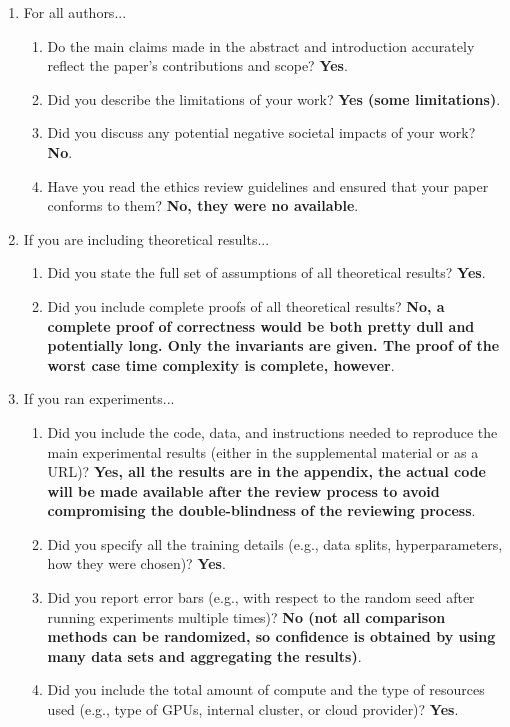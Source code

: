 \documentclass{article}
\begin{document}
\begin{enumerate}

\item For all authors...
\begin{enumerate}
  \item Do the main claims made in the abstract and introduction accurately reflect the paper's contributions and scope?
    \textbf{Yes}. %
  \item Did you describe the limitations of your work?
    \textbf{Yes (some limitations)}.
  \item Did you discuss any potential negative societal impacts of your work?
		\textbf{No}.
  \item Have you read the ethics review guidelines and ensured that your paper conforms to them?
		\textbf{No, they were no available}.
\end{enumerate}

\item If you are including theoretical results...
\begin{enumerate}
  \item Did you state the full set of assumptions of all theoretical results?
	\textbf{Yes}.
	\item Did you include complete proofs of all theoretical results?
	\textbf{No, a complete proof of correctness would be both pretty dull and potentially long. Only the invariants are given. The proof of the worst case time complexity is complete, however}.
\end{enumerate}

\item If you ran experiments...
\begin{enumerate}
  \item Did you include the code, data, and instructions needed to reproduce the main experimental results (either in the supplemental material or as a URL)?
		\textbf{Yes, all the results are in the appendix, the actual code will be made available after the review process to avoid compromising the double-blindness of the reviewing process}.
  \item Did you specify all the training details (e.g., data splits, hyperparameters, how they were chosen)?
		\textbf{Yes}.
	\item Did you report error bars (e.g., with respect to the random seed after running experiments multiple times)?
    \textbf{No (not all comparison methods can be randomized, so confidence is obtained by using many data sets and aggregating the results)}.
	\item Did you include the total amount of compute and the type of resources used (e.g., type of GPUs, internal cluster, or cloud provider)?
		\textbf{Yes}.
\end{enumerate}


\end{enumerate}
\end{document}
